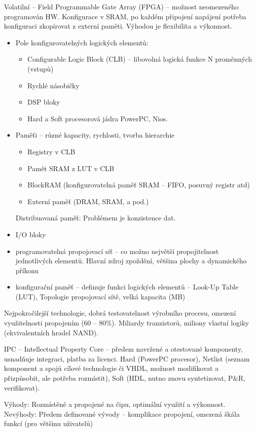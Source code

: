 \documentclass[a4paper, 11pt]{report}
\begin{document}
Volatilní -- Field Programmable Gate Array (FPGA) -- možnost neomezeného programován HW. Konfigurace v SRAM, po každém připojení napájení potřeba konfiguraci zkopírovat z externí paměti. Výhodou je flexibilita a výkonnost.
\begin{itemize}
	\item Pole konfigurovatelných logických elementů:
	\begin{itemize}
		\item Configurable Logic Block (CLB) -- libovolná logická funkce N proměnných (vstupů)
		\item Rychlé násobičky
		\item DSP bloky
		\item Hard a Soft procesorová jádra PowerPC, Nios.
	\end{itemize}
	\item Paměťi -- různé kapacity, rychlosti, tvorba hierarchie
	\begin{itemize}
		\item Registry v CLB
		\item Pamět SRAM z LUT v CLB
		\item BlockRAM (konfigurovatelná paměť SRAM -- FIFO, posuvný registr atd)
		\item Externí paměť (DRAM, SRAM, a pod.)
	\end{itemize}
	Distribuovaná paměť: Problémem je konzistence dat.
	\item I/O bloky
	\item programovatelná propojovací síť -- co možno největší propojitelnost jednotlivých elementů. Hlavní zdroj zpoždění, většina plochy a dynamického příkonu
	\item konfigurační paměť -- definuje funkci logických elementů -- Look-Up Table (LUT), Topologie propojovací sítě, velká kapacita (MB)
\end{itemize}

Nejpokročilejší technologie, dobrá testovatelnost výrobního procesu, omezení využitelnosti propojením (60 -- 80\%). Miliardy tranzistorů, miliony vlastní logiky (ekvivalentních hradel NAND).

IPC -- Intellectual Property Core -- předem navržené a otestované komponenty, usnadňuje integraci, platba za licenci. Hard (PowerPC procesor), Netlist (seznam komponent a spojů cílové technologie či VHDL, možnost modifikovat a přizpůsobit, ale potřeba rozmístit), Soft (HDL, nutno znovu syntetizovat, P\&R, verifikovat).

Výhody: Rozmístěné a propojené na čipu, optimální využití a výkonnost.\\
Nevýhody: Předem definované vývody -- komplikace propojení, omezená škála funkcí (pro většinu uživatelů)
\end{document}

